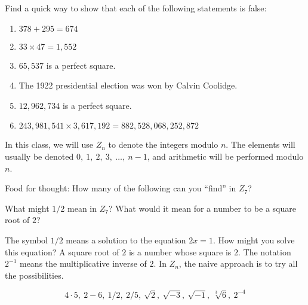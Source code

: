 \documentclass[space,nooutcomes]{ximera}
\begin{document}
\begin{problem}
Find a quick way to show that each of the following statements is false: 
\begin{enumerate}
\item $378 + 295 = 674$
\item $33 \times 47 = 1,552$
\item $65,537$ is a perfect square.
\item The 1922 presidential election was won by Calvin Coolidge.
\item $12,962,734$ is a perfect square.
\item $243,981,541 \times 3,617,192 = 882,528,068,252,872$
\end{enumerate}
\begin{freeResponse}
\end{freeResponse}
\end{problem}

In this class, we will use $Z_n$ to denote the integers modulo $n$.  The elements will usually be denoted $0,\ 1,\ 2,\ 3,\ \dots,\ n - 1$, and arithmetic will be performed modulo $n$.  

\begin{problem}
Food for thought:  How many of the following can you ``find'' in $Z_7$?  
\begin{hint}
What might $1/2$ mean in $Z_7$?  What would it mean for a number to be a square root of $2$?  
\end{hint}
\begin{hint}
The symbol $1/2$ means a solution to the equation $2x = 1$.  How might you solve this equation?  A square root of $2$ is a number whose square is $2$.  The notation $2^{-1}$ means the multiplicative inverse of $2$.  In $Z_n$, the na\:ive approach is to try all the possibilities.
\end{hint}
\[
4\cdot 5,\ 2 - 6,\ 1/2,\ 2/5,\ \sqrt{2},\ \sqrt{-3},\ \sqrt{-1},\ \sqrt[3]{6},\ 2^{-4}
\]
\begin{freeResponse}
\end{freeResponse}
\end{problem}
\end{document}
